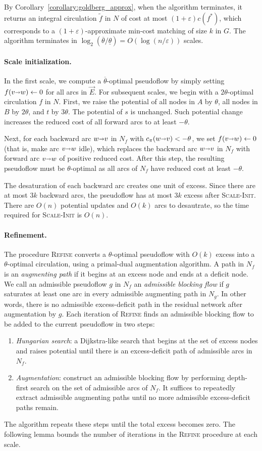\documentclass[11pt,twoside]{article}
\def\eps{\varepsilon}
\def\arcto{\mathord\shortrightarrow}
\def\arc#1#2{#1\arcto#2}
\def\cost{c}
\theoremstyle{plain}
\numberwithin{figure}{section}
\renewcommand{\subparagraph}{\paragraph}
\def\EMPH#1{\textcolor{BrickRed}{{\emph{#1}}}}
\begin{document}
By Corollary~\ref{corollary:goldberg_approx}, when the algorithm terminates,
it returns an integral circulation $\tilde{f}$ in $N$ of cost at most
$(1+\eps) \cost(f^*)$, which corresponds to a $(1+\eps)$-approximate min-cost
matching of size $k$ in $G$.
The algorithm terminates in
$\log_2(\overline{\theta}/\underline{\theta}) = O(\log(n/\eps))$ scales.


\subparagraph{Scale initialization.}
In the first scale, we compute a $\overline{\theta}$-optimal pseudoflow by
simply setting $f(\arc vw) \gets 0$ for all arcs in $\vec{E}$.
For subsequent scales, we begin with a $2\theta$-optimal circulation $f$ in $N$.
First, we raise the potential of all nodes in $A$ by $\theta$, all nodes in $B$ by $2\theta$,
and $t$ by $3\theta$.
The potential of $s$ is unchanged.
%
Such potential change increases the reduced cost of all forward arcs to at least
$-\theta$.

Next, for each backward arc $\arc wv$ in $N_f$ with $c_\pi(\arc wv) < -\theta$,
we set $f(\arc vw) \gets 0$ (that is, make arc $\arc vw$ idle), which replaces the
backward arc $\arc wv$ in $N_f$ with forward arc $\arc vw$ of positive reduced cost.
After this step, the resulting pseudoflow must be $\theta$-optimal as all arcs
of $N_f$ have reduced cost at least $-\theta$.

The desaturation of each backward arc creates one unit of excess.
Since there are at most $3k$ backward arcs, the pseudoflow has at most $3k$ excess after
\textsc{Scale-Init}.
There are $O(n)$ potential updates and $O(k)$ arcs to desautrate,
so the time required for \textsc{Scale-Init} is $O(n)$.

\subparagraph{Refinement.}
The procedure \textsc{Refine} converts a $\theta$-optimal pseudoflow with
$O(k)$ excess into a $\theta$-optimal circulation, using a primal-dual
augmentation algorithm.
A path in $N_f$ is an \EMPH{augmenting path} if it begins at an excess node
and ends at a deficit node.
We call an admissible pseudoflow $g$ in $N_f$ an
\EMPH{admissible blocking flow} if $g$ saturates at least one arc in every
admissible augmenting path in $N_g$.
In other words, there is no admissible excess-deficit path in the residual
network after augmentation by $g$.
Each iteration of \textsc{Refine} finds an admissible blocking flow to be added
to the current pseudoflow in two steps:
\begin{enumerate}
\item
\EMPH{Hungarian search}: a Dijkstra-like search that begins at the set of
excess nodes and raises potential until there is an excess-deficit path
of admissible arcs in $N_f$.
\item
\EMPH{Augmentation}: construct an admissible blocking flow by performing
depth-first search on the set of admissible arcs of $N_f$.
It suffices to repeatedly extract admissible augmenting paths until no more
admissible excess-deficit paths remain.
\end{enumerate}
The algorithm repeats these steps until the total excess becomes zero.
The following lemma bounds the number of iterations in the \textsc{Refine}
procedure at each scale.
\end{document}
